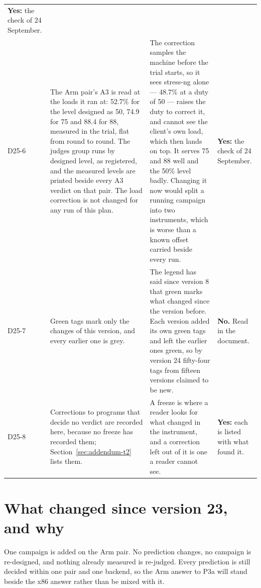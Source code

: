 \documentclass[11pt]{article}
\begin{document}
{\begin{longtable}{@{}p{1.1cm} >{\raggedright\arraybackslash}p{6.1cm} >{\raggedright\arraybackslash}p{6.0cm} >{\raggedright\arraybackslash}p{2.2cm}@{}}
\textbf{Yes:} the check of 24 September. \\
D25-6 & The Arm pair's A3 is read at the loads it ran at: 52.7\% for the level designed as 50,
74.9 for 75 and 88.4 for 88, measured in the trial, flat from round to round. The judges group
runs by designed level, as registered, and the measured levels are printed beside every A3
verdict on that pair. The load correction is not changed for any run of this plan. & The
correction samples the machine before the trial starts, so it sees stress-ng alone --- 48.7\%
at a duty of 50 --- raises the duty to correct it, and cannot see the client's own load, which
then lands on top. It serves 75 and 88 well and the 50\% level badly. Changing it now would
split a running campaign into two instruments, which is worse than a known offset carried beside
every run. & \textbf{Yes:} the check of 24 September. \\
D25-7 & Green tags mark only the changes of this version, and every earlier one is grey. & The
legend has said since version 8 that green marks what changed since the version before. Each
version added its own green tags and left the earlier ones green, so by version 24 fifty-four
tags from fifteen versions claimed to be new. & \textbf{No.} Read in the document. \\
D25-8 & Corrections to programs that decide no verdict are recorded here, because no freeze has
recorded them; Section~\ref{sec:addendum-t2} lists them. & A freeze is where a reader looks for
what changed in the instrument, and a correction left out of it is one a reader cannot see. &
\textbf{Yes:} each is listed with what found it. \\
\bottomrule
\end{longtable}}

\section*{What changed since version 23, and why}
One campaign is added on the Arm pair. No prediction changes, no campaign is re-designed, and
nothing already measured is re-judged. Every prediction is still decided within one pair and one
backend, so the Arm answer to P3a will stand beside the x86 answer rather than be mixed with it.
\end{document}
